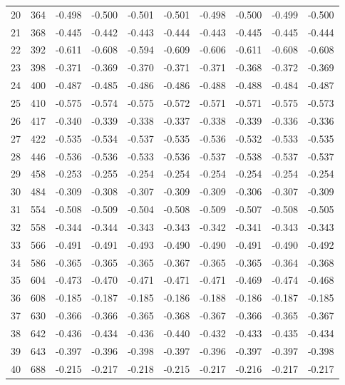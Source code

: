 \documentclass{amsart}
\begin{document}
\begin{longtable}{rrrrrrrrrr}
  20 & 364 & -0.498 & -0.500 & -0.501 & -0.501 & -0.498 & -0.500 & -0.499 & -0.500 \\ 
  21 & 368 & -0.445 & -0.442 & -0.443 & -0.444 & -0.443 & -0.445 & -0.445 & -0.444 \\ 
  22 & 392 & -0.611 & -0.608 & -0.594 & -0.609 & -0.606 & -0.611 & -0.608 & -0.608 \\ 
  23 & 398 & -0.371 & -0.369 & -0.370 & -0.371 & -0.371 & -0.368 & -0.372 & -0.369 \\ 
  24 & 400 & -0.487 & -0.485 & -0.486 & -0.486 & -0.488 & -0.488 & -0.484 & -0.487 \\ 
  25 & 410 & -0.575 & -0.574 & -0.575 & -0.572 & -0.571 & -0.571 & -0.575 & -0.573 \\ 
  26 & 417 & -0.340 & -0.339 & -0.338 & -0.337 & -0.338 & -0.339 & -0.336 & -0.336 \\ 
  27 & 422 & -0.535 & -0.534 & -0.537 & -0.535 & -0.536 & -0.532 & -0.533 & -0.535 \\ 
  28 & 446 & -0.536 & -0.536 & -0.533 & -0.536 & -0.537 & -0.538 & -0.537 & -0.537 \\ 
  29 & 458 & -0.253 & -0.255 & -0.254 & -0.254 & -0.254 & -0.254 & -0.254 & -0.254 \\ 
  30 & 484 & -0.309 & -0.308 & -0.307 & -0.309 & -0.309 & -0.306 & -0.307 & -0.309 \\ 
  31 & 554 & -0.508 & -0.509 & -0.504 & -0.508 & -0.509 & -0.507 & -0.508 & -0.505 \\ 
  32 & 558 & -0.344 & -0.344 & -0.343 & -0.343 & -0.342 & -0.341 & -0.343 & -0.343 \\ 
  33 & 566 & -0.491 & -0.491 & -0.493 & -0.490 & -0.490 & -0.491 & -0.490 & -0.492 \\ 
  34 & 586 & -0.365 & -0.365 & -0.365 & -0.367 & -0.365 & -0.365 & -0.364 & -0.368 \\ 
  35 & 604 & -0.473 & -0.470 & -0.471 & -0.471 & -0.471 & -0.469 & -0.474 & -0.468 \\ 
  36 & 608 & -0.185 & -0.187 & -0.185 & -0.186 & -0.188 & -0.186 & -0.187 & -0.185 \\ 
  37 & 630 & -0.366 & -0.366 & -0.365 & -0.368 & -0.367 & -0.366 & -0.365 & -0.367 \\ 
  38 & 642 & -0.436 & -0.434 & -0.436 & -0.440 & -0.432 & -0.433 & -0.435 & -0.434 \\ 
  39 & 643 & -0.397 & -0.396 & -0.398 & -0.397 & -0.396 & -0.397 & -0.397 & -0.398 \\ 
  40 & 688 & -0.215 & -0.217 & -0.218 & -0.215 & -0.217 & -0.216 & -0.217 & -0.217 \\ 

\end{longtable}
\end{document}
